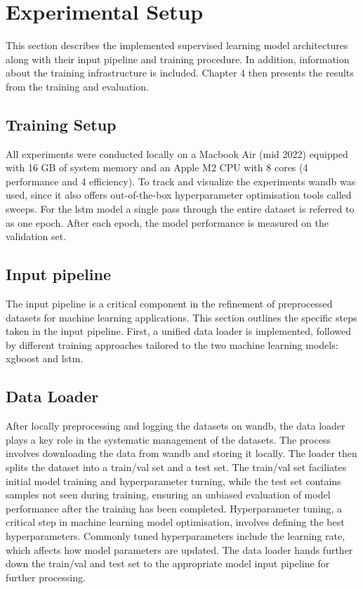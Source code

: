 \section{Experimental Setup}
\label{sec:Experimental_Setup}
This section describes the implemented supervised learning model architectures along with their input pipeline and training procedure. In addition, information about the training infrastructure is included. Chapter 4 then presents the results from the training and evaluation.

\subsection{Training Setup}
\label{sub:Training_Setup}
All experiments were conducted locally on a Macbook Air (mid 2022) equipped with 16 GB of system memory and an Apple M2 CPU with 8 cores (4 performance and 4 efficiency). To track and visualize the experiments \gls{wandb} was used, since it also offers out-of-the-box hyperparameter optimisation tools called sweeps.
\newline
\newline
For the \gls{lstm} model a single pass through the entire dataset is referred to as one epoch. After each epoch, the model performance is measured on the validation set.

\subsection{Input pipeline}
\label{sub:Input_Pipeline}
The input pipeline is a critical component in the refinement of preprocessed datasets for machine learning applications. This section outlines the specific steps taken in the input pipeline. First, a unified data loader is implemented, followed by different training approaches tailored to the two machine learning models: \gls{xgboost} and \gls{lstm}.

\subsection{Data Loader}
\label{sub:Data_Loader}
After locally preprocessing and logging the datasets on \gls{wandb}, the data loader plays a key role in the systematic management of the datasets. The process involves downloading the data from \gls{wandb} and storing it locally. The loader then splits the dataset into a train/val set and a test set. The train/val set faciliates initial model training and hyperparameter turning, while the test set contains samples not seen during training, ensuring an unbiased evaluation of model performance after the training has been completed. Hyperparameter tuning, a critical step in machine learning model optimisation, involves defining the best hyperparameters. Commonly tuned hyperparameters include the learning rate, which affects how model parameters are updated. The data loader hands further down the train/val and test set to the appropriate model input pipeline for further processing.

